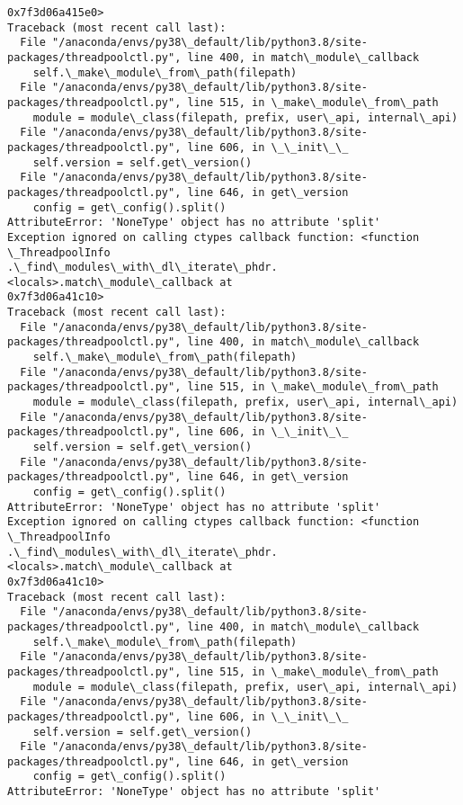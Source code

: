 \documentclass[11pt]{article}
\begin{document}
\begin{Verbatim}[commandchars=\\\{\}]
0x7f3d06a415e0>
Traceback (most recent call last):
  File "/anaconda/envs/py38\_default/lib/python3.8/site-
packages/threadpoolctl.py", line 400, in match\_module\_callback
    self.\_make\_module\_from\_path(filepath)
  File "/anaconda/envs/py38\_default/lib/python3.8/site-
packages/threadpoolctl.py", line 515, in \_make\_module\_from\_path
    module = module\_class(filepath, prefix, user\_api, internal\_api)
  File "/anaconda/envs/py38\_default/lib/python3.8/site-
packages/threadpoolctl.py", line 606, in \_\_init\_\_
    self.version = self.get\_version()
  File "/anaconda/envs/py38\_default/lib/python3.8/site-
packages/threadpoolctl.py", line 646, in get\_version
    config = get\_config().split()
AttributeError: 'NoneType' object has no attribute 'split'
Exception ignored on calling ctypes callback function: <function \_ThreadpoolInfo
.\_find\_modules\_with\_dl\_iterate\_phdr.<locals>.match\_module\_callback at
0x7f3d06a41c10>
Traceback (most recent call last):
  File "/anaconda/envs/py38\_default/lib/python3.8/site-
packages/threadpoolctl.py", line 400, in match\_module\_callback
    self.\_make\_module\_from\_path(filepath)
  File "/anaconda/envs/py38\_default/lib/python3.8/site-
packages/threadpoolctl.py", line 515, in \_make\_module\_from\_path
    module = module\_class(filepath, prefix, user\_api, internal\_api)
  File "/anaconda/envs/py38\_default/lib/python3.8/site-
packages/threadpoolctl.py", line 606, in \_\_init\_\_
    self.version = self.get\_version()
  File "/anaconda/envs/py38\_default/lib/python3.8/site-
packages/threadpoolctl.py", line 646, in get\_version
    config = get\_config().split()
AttributeError: 'NoneType' object has no attribute 'split'
Exception ignored on calling ctypes callback function: <function \_ThreadpoolInfo
.\_find\_modules\_with\_dl\_iterate\_phdr.<locals>.match\_module\_callback at
0x7f3d06a41c10>
Traceback (most recent call last):
  File "/anaconda/envs/py38\_default/lib/python3.8/site-
packages/threadpoolctl.py", line 400, in match\_module\_callback
    self.\_make\_module\_from\_path(filepath)
  File "/anaconda/envs/py38\_default/lib/python3.8/site-
packages/threadpoolctl.py", line 515, in \_make\_module\_from\_path
    module = module\_class(filepath, prefix, user\_api, internal\_api)
  File "/anaconda/envs/py38\_default/lib/python3.8/site-
packages/threadpoolctl.py", line 606, in \_\_init\_\_
    self.version = self.get\_version()
  File "/anaconda/envs/py38\_default/lib/python3.8/site-
packages/threadpoolctl.py", line 646, in get\_version
    config = get\_config().split()
AttributeError: 'NoneType' object has no attribute 'split'

\end{Verbatim}
\end{document}
